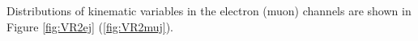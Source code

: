 Distributions of kinematic variables in the electron (muon) channels are shown in Figure \ref{fig:VR2ej} (\ref{fig:VR2muj}).

